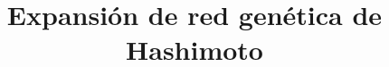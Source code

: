 \documentclass{bmcart}
\begin{document}
	\begin{frontmatter}
	
		\begin{fmbox}
			
			
			\title{Expansión de red genética de Hashimoto}
			
			
			\author[
			  addressref={aff1},                   %
			  corref={aff1},                       %
			  email={alejandrodominguezrecio@uma.es}   %
			]{ } %
		
			\author[
			  addressref={aff1},                   %
			  email={rafatravil@gmail.com}   %
			]{ } %
		
			
			
			\address[id=aff1]{%
			  ,             %
			  ,          %
			  ,                              %
			}
		
		\end{fmbox}%
		
		\begin{abstractbox}
		

\end{abstractbox}
\end{frontmatter}
\end{document}
